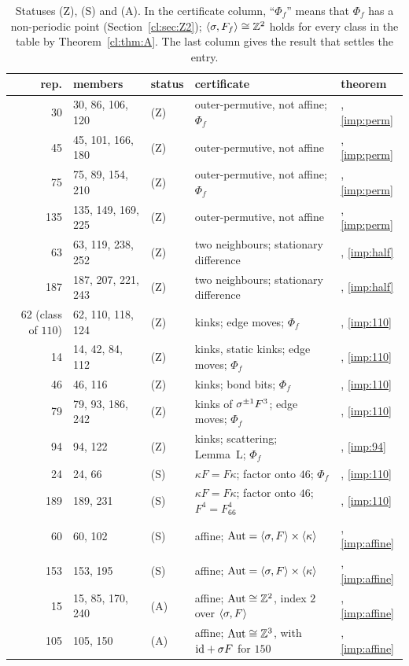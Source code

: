 \begin{table}[!htbp]
\caption{Statuses (Z), (S) and (A). In the certificate column, ``$\Phi_f$'' means that $\Phi_f$ has a non-periodic point (Section~\ref{cl:sec:Z2}); $\langle\sigma,F_f\rangle\cong\mathbb{Z}^2$ holds for every class in the table by Theorem~\ref{cl:thm:A}. The last column gives the result that settles the entry.}
\label{cl:tab:decided}
\centering\footnotesize\renewcommand{\arraystretch}{0.9}
\begin{tabular}{rllll}
\toprule
rep. & members & status & certificate & theorem\\
\midrule
30 & 30, 86, 106, 120 & (Z) & outer-permutive, not affine; $\Phi_f$ & \cite{PaperB}, \eqref{imp:perm}\\
45 & 45, 101, 166, 180 & (Z) & outer-permutive, not affine & \cite{PaperB}, \eqref{imp:perm}\\
75 & 75, 89, 154, 210 & (Z) & outer-permutive, not affine; $\Phi_f$ & \cite{PaperB}, \eqref{imp:perm}\\
135 & 135, 149, 169, 225 & (Z) & outer-permutive, not affine & \cite{PaperB}, \eqref{imp:perm}\\
63 & 63, 119, 238, 252 & (Z) & two neighbours; stationary difference & \cite{PaperB}, \eqref{imp:half}\\
187 & 187, 207, 221, 243 & (Z) & two neighbours; stationary difference & \cite{PaperB}, \eqref{imp:half}\\
62 (class of $110$) & 62, 110, 118, 124 & (Z) & kinks; edge moves; $\Phi_f$ & \cite{PaperA}, \eqref{imp:110}\\
14 & 14, 42, 84, 112 & (Z) & kinks, static kinks; edge moves; $\Phi_f$ & \cite{PaperA}, \eqref{imp:110}\\
46 & 46, 116 & (Z) & kinks; bond bits; $\Phi_f$ & \cite{PaperA}, \eqref{imp:110}\\
79 & 79, 93, 186, 242 & (Z) & kinks of $\sigma^{\pm1}F^3$; edge moves; $\Phi_f$ & \cite{PaperA}, \eqref{imp:110}\\
94 & 94, 122 & (Z) & kinks; scattering; Lemma~L; $\Phi_f$ & \cite{PaperE}, \eqref{imp:94}\\
\midrule
24 & 24, 66 & (S) & $\kappa F=F\kappa$; factor onto $46$; $\Phi_f$ & \cite{PaperA}, \eqref{imp:110}\\
189 & 189, 231 & (S) & $\kappa F=F\kappa$; factor onto $46$; $F^4=F_{66}^4$ & \cite{PaperA}, \eqref{imp:110}\\
60 & 60, 102 & (S) & affine; $\operatorname{Aut}=\langle\sigma,F\rangle\times\langle\kappa\rangle$ & \cite{PaperC}, \eqref{imp:affine}\\
153 & 153, 195 & (S) & affine; $\operatorname{Aut}=\langle\sigma,F\rangle\times\langle\kappa\rangle$ & \cite{PaperC}, \eqref{imp:affine}\\
\midrule
15 & 15, 85, 170, 240 & (A) & affine; $\operatorname{Aut}\cong\mathbb{Z}^2$, index $2$ over $\langle\sigma,F\rangle$ & \cite{PaperC}, \eqref{imp:affine}\\
105 & 105, 150 & (A) & affine; $\operatorname{Aut}\cong\mathbb{Z}^3$, with $\mathrm{id}+\sigma F$ for $150$ & \cite{PaperC}, \eqref{imp:affine}\\
\bottomrule
\end{tabular}


\end{table}
